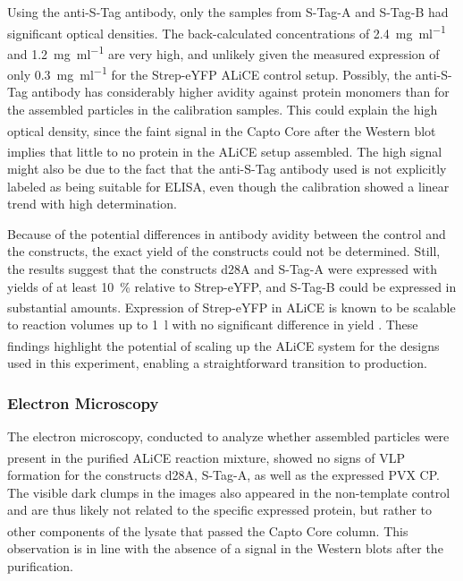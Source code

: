 Using the anti-S-Tag antibody, only the samples from S-Tag-A and S-Tag-B had significant optical densities. The back-calculated concentrations of \SI{2.4}{\milli\gram\per\milli\litre} and \SI{1.2}{\milli\gram\per\milli\litre} are very high, and unlikely given the measured expression of only \SI{0.3}{\milli\gram\per\milli\litre} for the Strep-eYFP ALiCE\textsuperscript{\textregistered} control setup. Possibly, the anti-S-Tag antibody has considerably higher avidity against protein monomers than for the assembled particles in the calibration samples. This could explain the high optical density, since the faint signal in the Capto\textsuperscript{\texttrademark} Core after the Western blot implies that little to no protein in the ALiCE\textsuperscript{\textregistered} setup assembled. The high signal might also be due to the fact that the anti-S-Tag antibody used is not explicitly labeled as being suitable for ELISA, even though the calibration showed a linear trend with high determination.

Because of the potential differences in antibody avidity between the control and the constructs, the exact yield of the constructs could not be determined. Still, the results suggest that the constructs d28A and S-Tag-A were expressed with yields of at least \SI{10}{\percent} relative to Strep-eYFP, and S-Tag-B could be expressed in substantial amounts. Expression of Strep-eYFP in ALiCE\textsuperscript{\textregistered} is known to be scalable to reaction volumes up to \SI{1}{\litre} with no significant difference in yield \cite{alice_system}. These findings highlight the potential of scaling up the ALiCE\textsuperscript{\textregistered} system for the designs used in this experiment, enabling a straightforward transition to production.

\subsubsection{Electron Microscopy}
The electron microscopy, conducted to analyze whether assembled particles were present in the purified ALiCE\textsuperscript{\textregistered} reaction mixture, showed no signs of VLP formation for the constructs d28A, S-Tag-A, as well as the expressed PVX CP. The visible dark clumps in the images also appeared in the non-template control and are thus likely not related to the specific expressed protein, but rather to other components of the lysate that passed the Capto\textsuperscript{\texttrademark} Core column. This observation is in line with the absence of a signal in the Western blots after the purification. 

